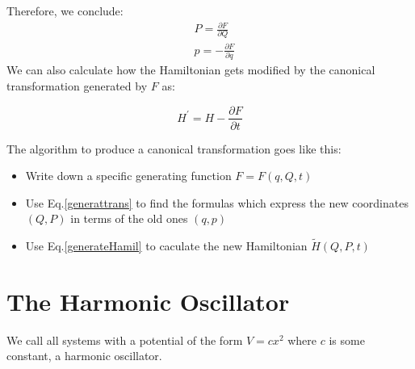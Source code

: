 Therefore, we conclude:
$$
\begin{aligned}
&P=\frac{\partial F}{\partial Q}\\
&p=-\frac{\partial F}{\partial q}
\end{aligned}
$$
We can also calculate how the Hamiltonian gets modified by the canonical transformation generated by $F$ as:
\begin{qt}
    \begin{equation}
        H^{\prime}=H-\frac{\partial F}{\partial t}
        \label{generateHamil}
    \end{equation}
\end{qt}

The algorithm to produce a canonical transformation goes like this:
\begin{qt}
    \begin{itemize}
    \item Write down a specific generating function $F=F(q, Q, t)$
    \item Use Eq.\ref{generattrans} to find the formulas which express the new coordinates $(Q, P)$ in terms of the old ones $(q, p)$
    \item Use Eq.\ref{generateHamil} to caculate the new Hamiltonian $\tilde{H}(Q,P,t)$
\end{itemize}
\end{qt}

\section{The Harmonic Oscillator}
We call all systems with a potential of the form $V=c x^{2}$ where $c$ is some constant, a harmonic oscillator.